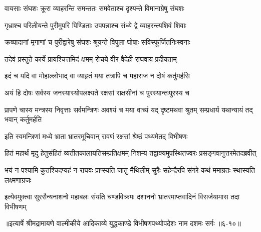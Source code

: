 \twolineshloka
{वायसाः संघशः क्रूरा व्याहरन्ति समन्ततः}
{समवेताश्च दृश्यन्ते विमानाग्रेषु संघशः} %

\twolineshloka
{गृध्राश्च परिलीयन्ते पुरीमुपरि पिण्डिताः}
{उपपन्नाश्च संध्ये द्वे व्याहरन्त्यशिवं शिवाः} %

\twolineshloka
{क्रव्यादानां मृगाणां च पुरीद्वारेषु संघशः}
{श्रूयन्ते विपुला घोषाः सविस्फूर्जितनिःस्वनाः} %

\twolineshloka
{तदेवं प्रस्तुते कार्ये प्रायश्चित्तमिदं क्षमम्}
{रोचये वीर वैदेही राघवाय प्रदीयताम्} %

\twolineshloka
{इदं च यदि वा मोहाल्लोभाद् वा व्याहृतं मया}
{तत्रापि च महाराज न दोषं कर्तुमर्हसि} %

\twolineshloka
{अयं हि दोषः सर्वस्य जनस्यास्योपलक्ष्यते}
{रक्षसां राक्षसीनां च पुरस्यान्तःपुरस्य च} %

\threelineshloka
{प्रापणे चास्य मन्त्रस्य निवृत्ताः सर्वमन्त्रिणः}
{अवश्यं च मया वाच्यं यद् दृष्टमथवा श्रुतम्}
{सम्प्रधार्य यथान्यायं तद् भवान् कर्तुमर्हति} %

\twolineshloka
{इति स्वमन्त्रिणां मध्ये भ्राता भ्रातरमूचिवान्}
{रावणं रक्षसां श्रेष्ठं पथ्यमेतद् विभीषणः} %

\twolineshloka
{हितं महार्थं मृदु हेतुसंहितं व्यतीतकालायतिसम्प्रतिक्षमम्}
{निशम्य तद्वाक्यमुपस्थितज्वरः प्रसङ्गवानुत्तरमेतदब्रवीत्} %

\twolineshloka
{भयं न पश्यामि कुतश्चिदप्यहं न राघवः प्राप्स्यति जातु मैथिलीम्}
{सुरैः सहेन्द्रैरपि संगरे कथं ममाग्रतः स्थास्यति लक्ष्मणाग्रजः} %

\twolineshloka
{इत्येवमुक्त्वा सुरसैन्यनाशनो महाबलः संयति चण्डविक्रमः}
{दशाननो भ्रातरमाप्तवादिनं विसर्जयामास तदा विभीषणम्} %


॥इत्यार्षे श्रीमद्रामायणे वाल्मीकीये आदिकाव्ये युद्धकाण्डे विभीषणपथ्योपदेशः नाम दशमः सर्गः ॥६-१०॥
